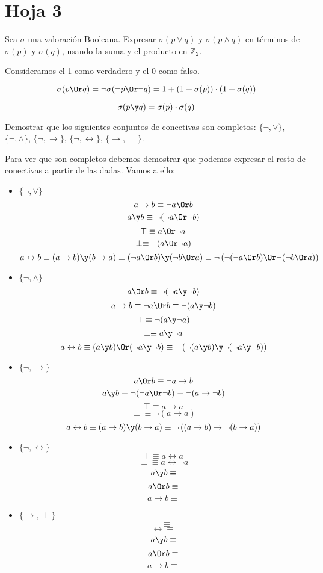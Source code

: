 \section{Hoja 3}

\begin{problem}[1]
Sea $\sigma$ una valoraci\'on Booleana. Expresar $\sigma(p\vee q)$ y
$\sigma(p\wedge q)$ en t\'erminos de
$\sigma(p)$ y $\sigma(q)$,
usando la suma y el producto en $\mathbb{Z}_2$.
\solution

Consideramos el 1 como verdadero y el 0 como falso.

\spart
\[\sigma(p \Or q) = \neg\sigma(\neg p \Or \neg q) = 1+(1+\sigma(p))\cdot (1+\sigma(q))\]

\spart
\[\sigma(p \y q ) = \sigma(p) \cdot \sigma(q)\]
\end{problem}

\begin{problem}[2]
Demostrar que los siguientes conjuntos de conectivas son completos:
$\{\neg, \vee\}$,  $\{\neg, \wedge\}$,  $\{\neg, \to\}$, $\{\neg, \leftrightarrow\}$,
$\{\to, \perp\}$.
\solution

Para ver que son completos debemos demostrar que podemos expresar el resto de conectivas a partir de las dadas. Vamos a ello:

\begin{itemize}
\item \textbf{$\{\neg, \vee\}$}
\[a \to b \equiv \neg a \Or b\]
\[a \y b \equiv \neg( \neg a \Or \neg b)\]
\[\top \equiv a \Or \neg a\]
\[\perp \equiv \neg (a \Or \neg a)\]
\[a \leftrightarrow b \equiv (a \to b) \y (b \to a) \equiv (\neg a \Or b) \y (\neg b \Or a) \equiv \neg \left( \neg (\neg a \Or b) \Or \neg (\neg b \Or a)\right)\]

\item \textbf{$\{\neg, \wedge\}$}
\[a \Or b \equiv \neg( \neg a \y \neg b)\]
\[a \to b \equiv \neg a \Or b \equiv \neg (a \y \neg b)\]
\[\top \equiv \neg (a \y \neg a)\]
\[\perp \equiv a \y \neg a\]
\[a \leftrightarrow b \equiv (a \y b) \Or (\neg a \y \neg b) \equiv \neg \left(\neg(a \y b) \y \neg (\neg a \y \neg b) \right)\]

\item \textbf{$\{\neg, \to\}$}
\[a \Or b \equiv \neg a \to b\]
\[a \y b \equiv \neg ( \neg a \Or \neg b) \equiv \neg ( a \to \neg b)\]
\[\top \equiv a \to a\]
\[\perp \equiv \neg (a \to  a)\]
\[a \leftrightarrow b \equiv (a \to b) \y (b \to a) \equiv \neg \left( (a \to b) \to \neg ( b \to a )\right)\]

\item \textbf{$\{\neg, \leftrightarrow\}$}
\[\top \equiv a \leftrightarrow a\]
\[\perp \equiv a \leftrightarrow \neg a\]
\[a \y b \equiv \]
\[a \Or b \equiv\]
\[a \to b \equiv\]

\item \textbf{$\{\to, \perp\}$}
\[\top \equiv \]
\[\leftrightarrow \equiv \]
\[a \y b \equiv \]
\[a \Or b \equiv\]
\[a \to b \equiv\]
\end{itemize}

\end{problem}


